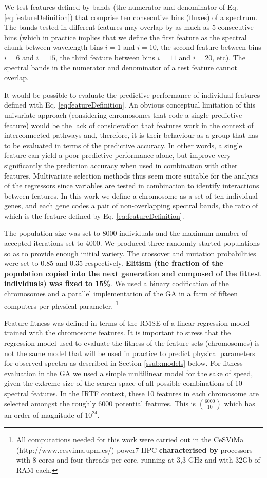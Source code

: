 We test features defined by bands (the numerator and denominator of
Eq. \ref{eq:featureDefinition}) that comprise ten consecutive bins
(fluxes) of a spectrum. The bands tested in different features may
overlap by as much as 5 consecutive bins (which in practice implies
that we define the first feature as the spectral chunk between
wavelength bins $i=1$ and $i=10$, the second feature between bins
$i=6$ and $i=15$, the third feature between bins $i=11$ and $i=20$,
etc). The spectral bands in the numerator and denominator of a test
feature cannot overlap.

It would be possible to evaluate the predictive performance of
individual features defined with Eq. \ref{eq:featureDefinition}. An
obvious conceptual limitation of this univariate approach (considering
chromosomes that code a single predictive feature) would be the lack
of consideration that features work in the context of interconnected
pathways and, therefore, it is their behaviour as a group that has to
be evaluated in terms of the predictive accuracy. In other words, a
single feature can yield a poor predictive performance alone, but
improve very significantly the prediction accuracy when used in
combination with other features. Multivariate selection methods thus
seem more suitable for the analysis of the regressors since variables
are tested in combination to identify interactions between
features. In this work we define a chromosome as a set of ten
individual genes, and each gene codes a pair of non-overlapping
spectral bands, the ratio of which is the feature defined by
Eq. \ref{eq:featureDefinition}.

The population size was set to 8000 individuals and the maximum number
of accepted iterations set to 4000. We produced three randomly started
populations so as to provide enough initial variety. The crossover and
mutation probabilities were set to 0.85 and 0.35 respectively. {\bf
Elitism (the fraction of the population copied into the next
generation and composed of the fittest individuals) was fixed to
15\%}. We used a binary codification of the chromosomes and a parallel
implementation of the GA in a farm of fifteen computers per physical
parameter. \footnote{All computations needed for this work were
carried out in the CeSViMa (http://www.cesvima.upm.es/) power7 HPC
{\bf characterised by} processors with 8 cores and four threads per
core, running at 3,3 GHz and with 32Gb of RAM each.}

Feature fitness was defined in terms of the RMSE of a linear
regression model trained with the chromosome features. It is important
to stress that the regression model used to evaluate the fitness of
the feature sets (chromosomes) is not the same model that will be used
in practice to predict physical parameters for observed spectra as
described in Section \ref{ssub:models} below. For fitness
evaluation in the GA we used a simple multilinear model for the sake
of speed, given the extreme size of the search space of all possible
combinations of 10 spectral features. In the IRTF context, these 10
features in each chromosome are selected amongst the roughly 6000
potential features. This is $\binom{6000}{10}$ which has an order of
magnitude of $10^{24}$.

